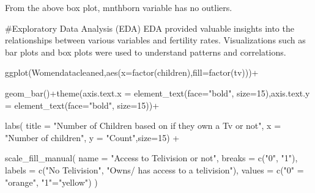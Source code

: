 \documentclass[
  letterpaper,
  DIV=11,
  numbers=noendperiod]{scrartcl}
\newenvironment{Shaded}{\begin{snugshade}}{\end{snugshade}}
\newcommand{\AttributeTok}[1]{\textcolor[rgb]{0.40,0.45,0.13}{#1}}
\newcommand{\DecValTok}[1]{\textcolor[rgb]{0.68,0.00,0.00}{#1}}
\newcommand{\FunctionTok}[1]{\textcolor[rgb]{0.28,0.35,0.67}{#1}}
\newcommand{\NormalTok}[1]{\textcolor[rgb]{0.00,0.23,0.31}{#1}}
\newcommand{\OtherTok}[1]{\textcolor[rgb]{0.00,0.23,0.31}{#1}}
\newcommand{\SpecialCharTok}[1]{\textcolor[rgb]{0.37,0.37,0.37}{#1}}
\newcommand{\StringTok}[1]{\textcolor[rgb]{0.13,0.47,0.30}{#1}}
\begin{document}
From the above box plot, mnthborn variable has no outliers.

\#Exploratory Data Analysis (EDA) EDA provided valuable insights into
the relationships between various variables and fertility rates.
Visualizations such as bar plots and box plots were used to understand
patterns and correlations.

\begin{Shaded}
\begin{Highlighting}[]
\FunctionTok{ggplot}\NormalTok{(Womendatacleaned,}\FunctionTok{aes}\NormalTok{(}\AttributeTok{x=}\FunctionTok{factor}\NormalTok{(children),}\AttributeTok{fill=}\FunctionTok{factor}\NormalTok{(tv)))}\SpecialCharTok{+}
  
\FunctionTok{geom\_bar}\NormalTok{()}\SpecialCharTok{+}\FunctionTok{theme}\NormalTok{(}\AttributeTok{axis.text.x =} \FunctionTok{element\_text}\NormalTok{(}\AttributeTok{face=}\StringTok{"bold"}\NormalTok{, }\AttributeTok{size=}\DecValTok{15}\NormalTok{),}\AttributeTok{axis.text.y =} \FunctionTok{element\_text}\NormalTok{(}\AttributeTok{face=}\StringTok{"bold"}\NormalTok{, }\AttributeTok{size=}\DecValTok{15}\NormalTok{))}\SpecialCharTok{+}
  
\FunctionTok{labs}\NormalTok{(}
    \AttributeTok{title =} \StringTok{"Number of Children based on if they own a Tv or not"}\NormalTok{,}
    \AttributeTok{x =} \StringTok{"Number of children"}\NormalTok{,}
    \AttributeTok{y =} \StringTok{"Count"}\NormalTok{,}\AttributeTok{size=}\DecValTok{15}\NormalTok{) }\SpecialCharTok{+}
   
\FunctionTok{scale\_fill\_manual}\NormalTok{(}
    \AttributeTok{name =} \StringTok{"Access to Telivision or not"}\NormalTok{,}
    \AttributeTok{breaks =} \FunctionTok{c}\NormalTok{(}\StringTok{"0"}\NormalTok{, }\StringTok{"1"}\NormalTok{),}
    \AttributeTok{labels =} \FunctionTok{c}\NormalTok{(}\StringTok{"No Telivision"}\NormalTok{, }\StringTok{"Owns/ has access to a telivision"}\NormalTok{),}
    \AttributeTok{values =} \FunctionTok{c}\NormalTok{(}\StringTok{"0"} \OtherTok{=} \StringTok{"orange"}\NormalTok{, }\StringTok{"1"}\OtherTok{=}\StringTok{"yellow"}\NormalTok{)}
\NormalTok{  )}
\end{Highlighting}
\end{Shaded}
\end{document}
